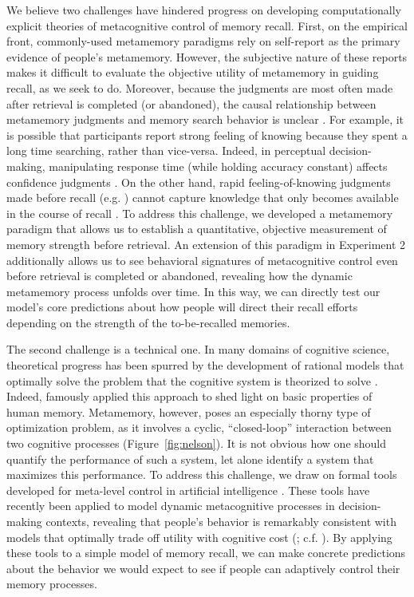 We believe two challenges have hindered progress on developing computationally explicit theories of metacognitive control of memory recall. First, on the empirical front, commonly-used metamemory paradigms rely on self-report as the primary evidence of people's metamemory. However, the subjective nature of these reports makes it difficult to evaluate the objective utility of metamemory in guiding recall, as we seek to do. Moreover, because the judgments are most often made after retrieval is completed (or abandoned), the causal relationship between metamemory judgments and memory search behavior is unclear \citep{schwartz2001relation}. For example, it is possible that participants report strong feeling of knowing because they spent a long time searching, rather than vice-versa. Indeed, in perceptual decision-making, manipulating response time (while holding accuracy constant) affects confidence judgments \citep{kiani2014choice}. On the other hand, rapid feeling-of-knowing judgments made before recall (e.g. \citealp{reder1987strategy}) cannot capture knowledge that only becomes available in the course of recall \citep{koriat1993how,nhouyvanisvong1998rapid}. To address this challenge, we developed a metamemory paradigm that allows us to establish a quantitative, objective measurement of memory strength before retrieval. An extension of this paradigm in Experiment 2 additionally allows us to see behavioral signatures of metacognitive control even before retrieval is completed or abandoned, revealing how the dynamic metamemory process unfolds over time. In this way, we can directly test our model's core predictions about how people will direct their recall efforts depending on the strength of the to-be-recalled memories.

The second challenge is a technical one. In many domains of cognitive science, theoretical progress has been spurred by the development of rational models that optimally solve the problem that the cognitive system is theorized to solve \citep{savage1954foundations,tenenbaum2001generalization,anderson1991adaptive,knill1996perception,marr1982vision}. Indeed, \citet{anderson1989human} famously applied this approach to shed light on basic properties of human memory. Metamemory, however, poses an especially thorny type of optimization problem, as it involves a cyclic, ``closed-loop'' interaction between two cognitive processes (Figure~\ref{fig:nelson}). It is not obvious how one should quantify the performance of such a system, let alone identify a system that maximizes this performance. To address this challenge, we draw on formal tools developed for meta-level control in artificial intelligence \citep{russell1991principles,hay2016principles}. These tools have recently been applied to model dynamic metacognitive processes in decision-making contexts, revealing that people's behavior is remarkably consistent with models that optimally trade off utility with cognitive cost (\citealp{callaway2021fixation,callaway2022rational}; c.f. \citealp{drugowitsch2012cost,tajima2019optimal,jang2021optimal,chen2021apparently}). By applying these tools to a simple model of memory recall, we can make concrete predictions about the behavior we would expect to see if people can adaptively control their memory processes.

